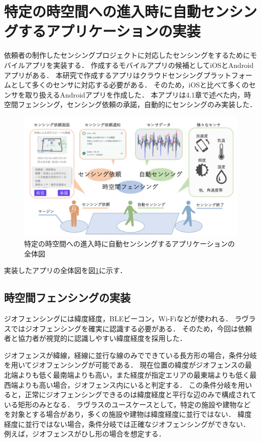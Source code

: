 \section{特定の時空間への進入時に自動センシングするアプリケーションの実装}
\label{myApp}
依頼者の制作したセンシングプロジェクトに対応したセンシングをするためにモバイルアプリを実装する．
作成するモバイルアプリの候補としてiOSとAndroidアプリがある．
本研究で作成するアプリはクラウドセンシングプラットフォームとして多くのセンサに対応する必要がある．
そのため，iOSと比べて多くのセンサを取り扱えるAndroidアプリを作成した．
本アプリは4.1章で述べた内，時空間フェンシング，センシング依頼の承諾，自動的にセンシングのみ実装した．

\begin{figure}[tbh]
    \centering
    \includegraphics[width=16cm]{img_myApp.png}
    \caption{特定の時空間への進入時に自動センシングするアプリケーションの全体図}
    \label{fig:myApp}
\end{figure}

実装したアプリの全体図を図\ref{fig:myApp}に示す．

\subsection{時空間フェンシングの実装}
\label{myApp_STF}
ジオフェンシングには緯度経度，BLEビーコン，Wi-Fiなどが使われる．
ラヴラスではジオフェンシングを確実に認識する必要がある．
そのため，今回は依頼者と協力者が視覚的に認識しやすい緯度経度を採用した．

ジオフェンスが緯線，経線に並行な線のみでできている長方形の場合，条件分岐を用いてジオフェンシングが可能である．
現在位置の緯度がジオフェンスの最北端よりも低く最南端よりも高い，また経度が指定エリアの最東端よりも低く最西端よりも高い場合，ジオフェンス内にいると判定する．
この条件分岐を用いると，正常にジオフェンシングできるのは緯度経度と平行な辺のみで構成されている矩形のみとなる．
ラヴラスのユースケースとして，特定の施設や建物などを対象とする場合があり，多くの施設や建物は緯度経度に並行ではない．
緯度経度に並行ではない場合，条件分岐では正確なジオフェンシングができない．
例えば，ジオフェンスがひし形の場合を想定する．

